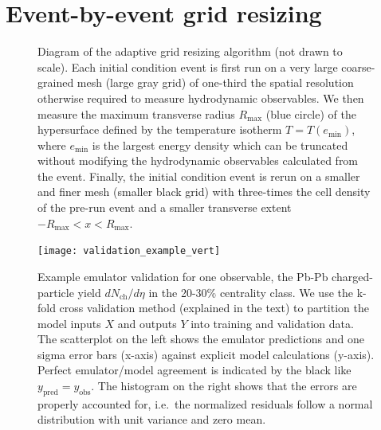 \documentclass[aps,prc,reprint,amsmath,nofootinbib]{revtex4-1}
\newcommand{\nch}{N_\text{ch}}
\begin{document}


\appendix

\section{Event-by-event grid resizing}
\label{app:adaptive_grid}

\begin{figure}
  \caption{
    \label{fig:adaptive_grid}
    Diagram of the adaptive grid resizing algorithm (not drawn to scale).
    Each initial condition event is first run on a very large coarse-grained mesh (large gray grid) of one-third the spatial resolution otherwise required to measure hydrodynamic observables.
    We then measure the maximum transverse radius $R_\text{max}$ (blue circle) of the hypersurface defined by the temperature isotherm $T = T(e_\text{min})$, where $e_\text{min}$ is the largest energy density which can be truncated without modifying the hydrodynamic observables calculated from the event.
    Finally, the initial condition event is rerun on a smaller and finer mesh (smaller black grid) with three-times the cell density of the pre-run event and a smaller transverse extent $-R_\text{max} < x < R_\text{max}$.
  }
\end{figure}

\begin{figure}[t]
  \texttt{[image: validation\_example\_vert]}
  \caption{
    \label{fig:validation_example}
    Example emulator validation for one observable, the Pb-Pb charged-particle yield $d\nch/d\eta$ in the 20-30\% centrality class.
    We use the k-fold cross validation method (explained in the text) to partition the model inputs $X$ and outputs $Y$ into training and validation data.
    The scatterplot on the left shows the emulator predictions and one sigma error bars (x-axis) against explicit model calculations (y-axis).
    Perfect emulator/model agreement is indicated by the black like $y_\text{pred}=y_\text{obs}$.
    The histogram on the right shows that the errors are properly accounted for, i.e.\ the normalized residuals follow a normal distribution with unit variance and zero mean.
  }
\end{figure}
\end{document}
